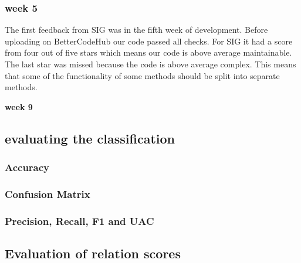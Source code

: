 \subsubsection{week 5}
The first feedback from SIG was in the fifth week of development. Before uploading on BetterCodeHub our code passed all checks. For SIG it had a score from four out of five stars which means our code is above average maintainable. The last star was missed because the code is above average complex. This means that some of the functionality of some methods should be split into separate methods.

\textbf{week 9} \\

\subsection{evaluating the classification}

\subsubsection{Accuracy}

\subsubsection{Confusion Matrix}

\subsubsection{Precision, Recall, F1 and UAC}

\subsection{Evaluation of relation scores}


